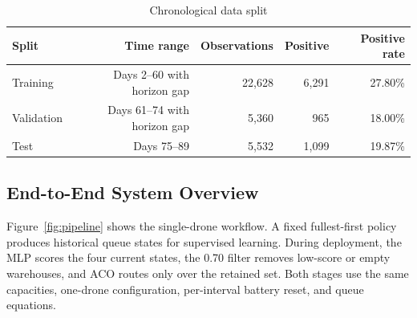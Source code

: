 \documentclass[10pt]{article}
\begin{document}
\begin{table}[H]
\centering
\caption{Chronological data split}
\label{tab:splits}
\small
\begin{tabular}{lrrrr}
\toprule
Split & Time range & Observations & Positive & Positive rate \\
\midrule
Training & Days 2--60 with horizon gap & 22,628 & 6,291 & 27.80\% \\
Validation & Days 61--74 with horizon gap & 5,360 & 965 & 18.00\% \\
Test & Days 75--89 & 5,532 & 1,099 & 19.87\% \\
\bottomrule
\end{tabular}
\end{table}

\subsection{End-to-End System Overview}

Figure~\ref{fig:pipeline} shows the single-drone workflow. A fixed fullest-first policy produces historical queue states for supervised learning. During deployment, the MLP scores the four current states, the 0.70 filter removes low-score or empty warehouses, and ACO routes only over the retained set. Both stages use the same capacities, one-drone configuration, per-interval battery reset, and queue equations.
\end{document}
